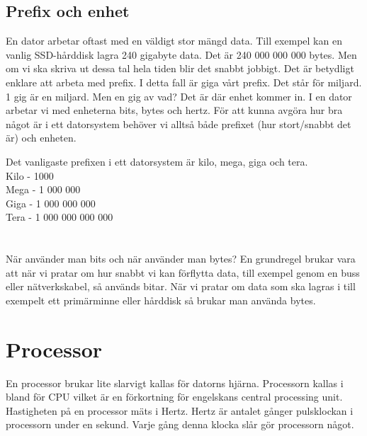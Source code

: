 \documentclass[12pt, letterpaper]{report}
\begin{document}
\section{Prefix och enhet}
En dator arbetar oftast med en väldigt stor mängd data. Till exempel kan en vanlig SSD-hårddisk lagra 240 gigabyte data. Det är 240 000 000 000 bytes. Men om vi ska skriva ut dessa tal hela tiden blir det snabbt jobbigt. Det är betydligt enklare att arbeta med prefix. I detta fall är giga vårt prefix. Det står för miljard. 1 gig är en miljard. Men en gig av vad? Det är där enhet kommer in. I en dator arbetar vi med enheterna bits, bytes och hertz. För att kunna avgöra hur bra något är i ett datorsystem behöver vi alltså både prefixet (hur stort/snabbt det är) och enheten. 

Det vanligaste prefixen i ett datorsystem är kilo, mega, giga och tera.\\
Kilo - 1000\\
Mega - 1 000 000\\
Giga - 1 000 000 000\\
Tera - 1 000 000 000 000\\\\\\

När använder man bits och när använder man bytes? En grundregel brukar vara att när vi pratar om hur snabbt vi kan förflytta data, till exempel genom en buss eller nätverkskabel, så används bitar. När vi pratar om data som ska lagras i till exempelt ett primärminne eller hårddisk så brukar man använda bytes. 

\chapter{Processor}
En processor brukar lite slarvigt kallas för datorns hjärna. Processorn kallas i bland för CPU vilket är en förkortning för engelskans central processing unit. Hastigheten på en processor mäts i Hertz. Hertz är antalet gånger pulsklockan i processorn under en sekund. Varje gång denna klocka slår gör processorn något. 
\end{document}
